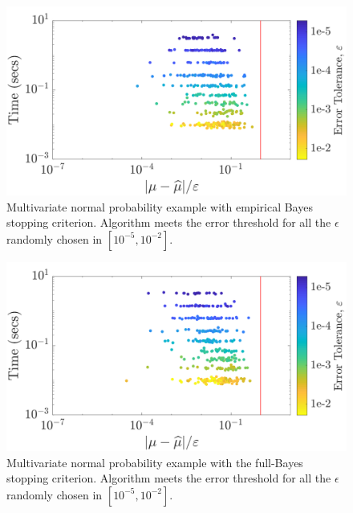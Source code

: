 \documentclass[graybox,footinfo]{svmult}
\newcommand{\FJHNote}[1]{{\textcolor{blue}{FJH: #1}}}
\newcommand{\JRNote}[1]{{\textcolor{green}{JR: #1}}}
\begin{document}
\begin{figure}
\centering
\includegraphics[width=0.95\linewidth]{"figures/Sobol/Sobol_MVN_guaranteed_time_MLE__d2_r1_2019-Sep-1"}
\caption[Sobol: MVN guaranteed:EB]{Multivariate normal probability example with empirical Bayes stopping criterion.  Algorithm meets the error threshold for all the $\epsilon$ randomly chosen in $[10^{-5}, 10^{-2}]$.}
\label{FJ:fig:Sobol-mvn-guaranteed-EB}
\end{figure}
\begin{figure}
\centering
\includegraphics[width=0.95\linewidth]{"figures/Sobol/Sobol_MVN_guaranteed_time_full__d2_r1_2019-Sep-1"}
\caption[Sobol: MVN guaranteed: Full Bayes]{Multivariate normal probability example with the full-Bayes stopping criterion. Algorithm meets the error threshold for all the $\epsilon$ randomly chosen in $[10^{-5}, 10^{-2}]$.}
\label{FJ:fig:Sobol-mvn-guaranteed-FB}
\end{figure}
\end{document}

